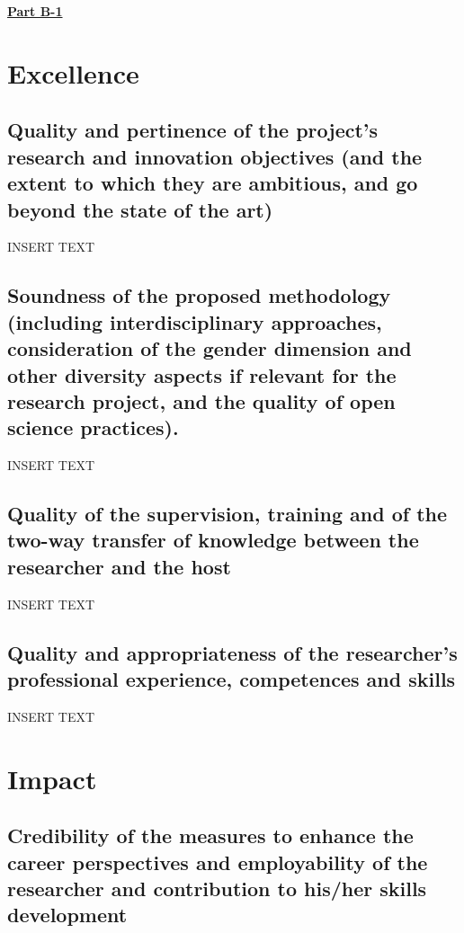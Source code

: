 \documentclass[11pt,a4paper]{article}
\title{}
\author{}
\date{\empty}
\newcommand{\fontSec}{\fontsize{14}{1} \selectfont}
\begin{document}
	\begin{center}
		\bfseries{\underline{\fontSec Part B-1}}
	\end{center}
	
	\section{Excellence }\label{sec:Excellence}

	\subsection{Quality and pertinence of the project’s research and innovation objectives (and the
		extent to which they are ambitious, and go beyond the state of the art)}
	
	INSERT TEXT
	
	
	\subsection{Soundness of the proposed methodology (including interdisciplinary approaches,
		consideration of the gender dimension and other diversity aspects if relevant for the
		research project, and the quality of open science practices).}
	
	INSERT TEXT
	
	\subsection{Quality of the supervision, training and of the two-way transfer of knowledge
		between the researcher and the host}
	
	INSERT TEXT
	
	\subsection{Quality and appropriateness of the researcher’s professional experience,
		competences and skills}
	
	INSERT TEXT
	
	\section{Impact }\label{sec:Impact}
	
	\subsection{Credibility of the measures to enhance the career perspectives and employability of
		the researcher and contribution to his/her skills development}
	
\end{document}
